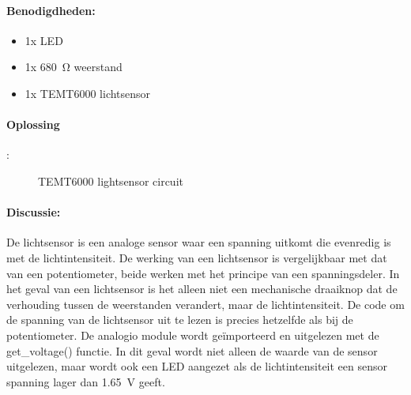 	\paragraph{Benodigdheden:}
	\begin{itemize}
		\item 1x LED
		\item 1x \SI{680}{\ohm} weerstand
		\item 1x TEMT6000 lichtsensor
	\end{itemize}
	\paragraph{Oplossing}:	
		\begin{figure}[H]
			\caption{TEMT6000 lightsensor circuit}
			\label{fig:Lightsensor}
		\end{figure}
\newpage
		
	\paragraph{Discussie:} De lichtsensor is een analoge sensor waar een spanning uitkomt die evenredig is met de lichtintensiteit. De werking van een lichtsensor is vergelijkbaar met dat van een potentiometer, beide werken met het principe van een spanningsdeler. In het geval van een lichtsensor is het alleen niet een mechanische draaiknop dat de verhouding tussen de weerstanden verandert, maar de lichtintensiteit. De code om de spanning van de lichtsensor uit te lezen is precies hetzelfde als bij de potentiometer. De analogio module wordt ge\"importeerd en uitgelezen met de get\_voltage() functie. In dit geval wordt niet alleen de waarde van de sensor uitgelezen, maar wordt ook een LED aangezet als de lichtintensiteit een sensor spanning lager dan \SI{1.65}{\volt} geeft.
	

